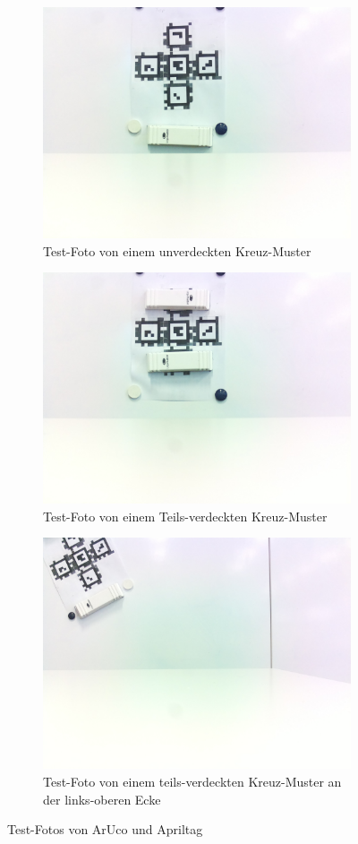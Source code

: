 \begin{figure}[H]
    \centering
    \begin{subfigure}[h]{0.5\textwidth}
        \includegraphics[width=0.5\linewidth]{graphics/MittelpunktTestFoto.jpg}
        \caption{Test-Foto von einem unverdeckten Kreuz-Muster}
        \label{fig:MittelpunktTest}
    \end{subfigure}
    \begin{subfigure}[h]{0.5\textwidth}
        \includegraphics[width=0.5\linewidth]{graphics/ocluded2Test.jpg}
        \caption{Test-Foto von einem Teils-verdeckten Kreuz-Muster}
        \label{fig:Mittelpunktocluded}
    \end{subfigure}
    \begin{subfigure}[h]{0.5\textwidth}
        \includegraphics[width=0.5\linewidth]{graphics/edgeExtreme.jpg}
        \caption{Test-Foto von einem teils-verdeckten Kreuz-Muster an der links-oberen Ecke}
        \label{fig:MittelpunktExtreme}
    \end{subfigure}
    
    \caption{Test-Fotos von ArUco und Apriltag}
\label{fig:TestFotosMittelpunkt}
\end{figure}

